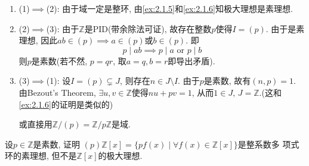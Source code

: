 \begin{solution}
    \begin{enumerate}[1.]
        \item (1)$\implies$(2): 由于域一定是整环, 由\ref{ex:2.1.5}和\ref{ex:2.1.6}知极大理想是素理想.
        \item (2)$\implies$(3): 由于$\mathbb{Z}$是PID(带余除法可证), 故存在整数$p$使得$I = (p)$. 由于是素理想, 因此$ab \in (p) \implies a \in (p)$或$b \in (p)$. 即
        \[
            p \mid ab \implies p \mid a \text{ or } p \mid b
        \]
        则$p$是素数(若不然, $p = qr$, 取$a = q, b = r$即导出矛盾).
        \item (3)$\implies$(1): 设$I = (p) \subsetneq J$, 则存在$n \in J \setminus I$. 由于$p$是素数, 故有$(n, p) = 1$. 由Bezout's Theorem, $\exists u, v \in \mathbb{Z}$使得$nu + pv = 1$, 从而$1 \in J,\, J = \mathbb{Z}$.(这和\ref{ex:2.1.6}的证明是类似的)
        
        或直接用$\mathbb{Z}/(p) = \mathbb{Z}/p\mathbb{Z}$是域.
    \end{enumerate}
\end{solution}

\begin{problem}\label{ex:2.1.8}
    设$p \in \mathbb{Z}$是素数, 证明
$(p)\mathbb{Z}[x] = \{pf(x) \mid \forall f(x) \in \mathbb{Z}[x]\}$是整系数多
项式环的素理想, 但不是$\mathbb{Z}[x]$的极大理想.
\end{problem}


